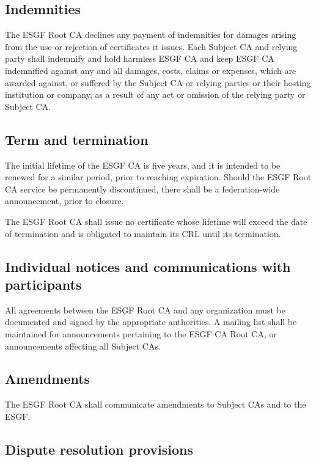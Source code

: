 \subsection{Indemnities}\label{indemnities}

The ESGF Root CA declines any payment of indemnities for damages
arising from the use or rejection of certificates it issues. Each
Subject CA and relying party shall indemnify and hold harmless ESGF CA
and keep ESGF CA indemnified against any and all damages, costs, claims
or expenses, which are awarded against, or suffered by the Subject CA or
relying parties or their hosting institution or company, as a result of
any act or omission of the relying party or Subject CA.

\subsection{Term and termination}\label{term-and-termination}

The initial lifetime of the ESGF CA is five years, and it is intended to be renewed for a similar period, prior to reaching expiration. Should the ESGF Root CA service be permanently discontinued, there shall be a federation-wide announcement, prior to closure.

The ESGF Root CA shall issue no certificate whose lifetime will exceed the date of termination and is obligated to maintain its CRL until its termination.

\subsection{Individual notices and communications with participants}\label{individual-notices-and-communications-with-participants}

All agreements between the ESGF Root CA and any organization must be
documented and signed by the appropriate authorities. A mailing list
shall be maintained for announcements pertaining to the ESGF CA Root
CA, or announcements affecting all Subject CAs.

\subsection{Amendments}\label{amendments}

The ESGF Root CA shall communicate amendments to Subject CAs and to
the ESGF.

\subsection{Dispute resolution provisions}\label{dispute-resolution-provisions}

